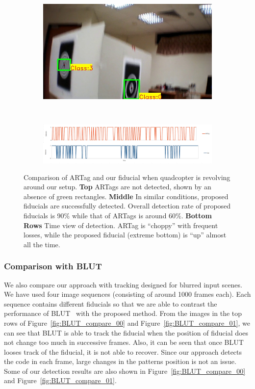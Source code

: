 \documentclass[10pt,twocolumn,letterpaper]{article}
\begin{document}
\begin{figure}
\begin{subfigure}[b]{.19\textwidth}
\end{subfigure}
\begin{subfigure}[b]{.19\textwidth}
\includegraphics[width=\linewidth]{images/setup_our/output_6/output_943.jpg}
\end{subfigure}\\
\begin{subfigure}[b]{\textwidth}
\includegraphics[width=\linewidth]{images/compare_detection.jpg}
\end{subfigure}
\caption{Comparison of ARTag and our fiducial when quadcopter is
  revolving around our setup. 
\textbf{Top} ARTags are not detected, shown by an absence of green rectangles. \textbf{Middle} In
similar conditions, proposed fiducials are successfully
detected. Overall detection rate of proposed
fiducials is 90\% while that of ARTags is around 60\%. 
\textbf{Bottom Rows} Time view of detection. ARTag is ``choppy'' with
frequent losses, while the proposed fiducial (extreme bottom) is
``up'' almost all the 
time.}
\label{fig:setup}
\end{figure}


\subsubsection{Comparison with BLUT}

We also compare our approach with tracking designed for blurred input
scenes.  We have used four image sequences (consisting of around 1000
frames each). Each sequence contains different fiducials so that we
are able to contrast the performance of BLUT~\cite{Wu:2011} with the
proposed method.  From the images in the top rows of
Figure~\ref{fig:BLUT_compare_00} and Figure~\ref{fig:BLUT_compare_01},
we can see that BLUT is able to track the fiducial when the position
of fiducial does not change too much in successive frames. Also, it
can be seen that once BLUT looses track of the fiducial, it is not
able to recover. Since our approach detects the code in each frame,
large changes in the patterns position is not an issue.  Some of our
detection results are also shown in Figure~\ref{fig:BLUT_compare_00}
and Figure~\ref{fig:BLUT_compare_01}.
\end{document}
